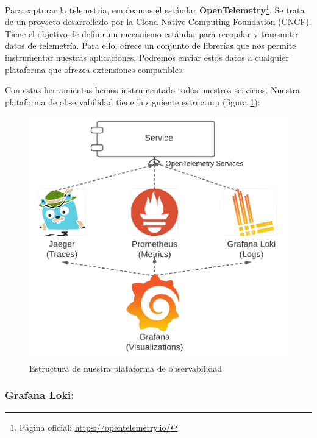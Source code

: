 Para capturar la telemetría, empleamos el estándar \textbf{OpenTelemetry}\footnote{Página oficial: \url{https://opentelemetry.io/}}. Se trata de un proyecto desarrollado por la Cloud Native Computing Foundation (CNCF). Tiene el objetivo de definir un mecanismo estándar para recopilar y transmitir datos de telemetría. Para ello, ofrece un conjunto de librerías que nos permite instrumentar nuestras aplicaciones. Podremos enviar estos datos a cualquier plataforma que ofrezca extensiones compatibles.

Con estas herramientas hemos instrumentado todos nuestros servicios. Nuestra plataforma de observabilidad tiene la siguiente estructura (figura \ref{fig:observability-telemetry-collection}):

\begin{figure}[h!]
  \centering
  \includegraphics[scale=0.25]{cap_despliegue/images/observability-telemetry-collection}
  \caption{Estructura de nuestra plataforma de observabilidad}
  \label{fig:observability-telemetry-collection}
\end{figure}

\pagebreak

\subsubsection{Grafana Loki: }

